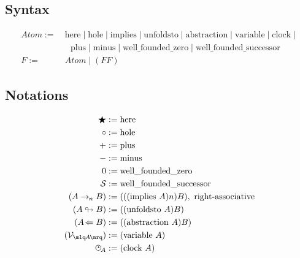\documentclass{article}
\begin{document}
  \subsection{Syntax}
  \begin{align*}
     Atom :=&\ \mathrm{here} \mid \mathrm{hole} \mid \mathrm{implies} \mid \mathrm{unfoldsto} \mid \mathrm{abstraction} \mid \mathrm{variable} \mid \mathrm{clock} \mid\\
      &\ \ \ \ \mathrm{plus} \mid \mathrm{minus} \mid \mathrm{well\_founded\_zero} \mid \mathrm{well\_founded\_successor}\\
     F :=&\ Atom \mid (F F)
  \end{align*}

  \subsection{Notations}
  

  \newcommand{\ic}[1]{#1}
  \newcommand{\here}{\bigstar}
  \newcommand{\hole}{\circ}
  \newcommand{\wfz}{0}
  \newcommand{\wfsucc}{\mathcal{S}}

  \renewcommand{\implies}[1]{\rightarrow_{\hspace{-0.04em}#1}}
  \newcommand{\proven}[1]{\vdash #1}
  \newcommand{\wellfounded}{\operatorname{\mathrm{well\_founded}}}
  \newcommand{\unfoldsto}{\looparrowright}
  \newcommand{\abst}[1]{#1\!\Leftarrow}
  \newcommand{\context}[2]{\mlq#1/#2\mrq}
  \newcommand{\variable}[1]{{\mathcal{V}_{\mlq\hspace{-0.06em}#1\hspace{-0.06em}\mrq}}}
  \newcommand{\clocksub}[1]{\text{\clock}_{\!#1}}
  \newcommand{\nameabst}[1]{#1 \Rightarrow}
  \newcommand{\axiom}[2]{\mathrm{Axiom}\ #1\ \mathrm{says}\ #2}
  \newcommand{\axiomatic}[1]{\infty #1}
  \newcommand{\usage}{\hole}
  \newcommand{\pop}[1]{#1\triangleleft}
  \newcommand{\subst}[3]{#1^{[{#2}{/}{#3}]}}

  \begin{align*}
    \here &:= \mathrm{here}\\
    \hole &:= \mathrm{hole}\\
    + &:= \mathrm{plus}\\
    - &:= \mathrm{minus}\\
    \wfz &:= \mathrm{well\_founded\_zero}\\
    \wfsucc &:= \mathrm{well\_founded\_successor}\\
    (A \implies{n} B) &:= (((\mathrm{implies}\ A) n) B),\ \operatorname{right-associative}\\
    (A \unfoldsto B) &:= ((\mathrm{unfoldsto}\ A) B)\\
    (\abst{A}{B}) &:= ((\mathrm{abstraction}\ A) B)\\
    (\variable{A}) &:= (\mathrm{variable}\ A)\\
    \clocksub{A} &:= (\mathrm{clock}\ A)\\
  \end{align*}
\end{document}
